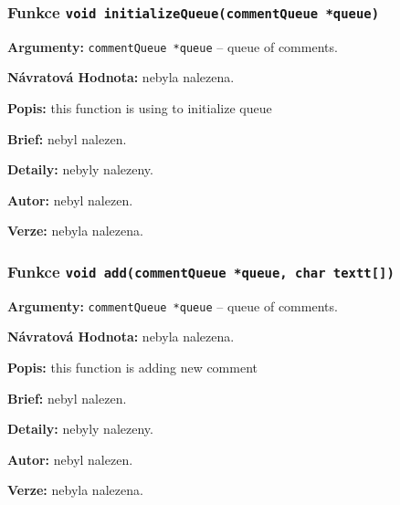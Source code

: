 \documentclass[12pt, a4paper]{article}
\begin{document}
\subsubsection{Funkce \texttt{void initializeQueue(commentQueue *queue)}}
\textbf{Argumenty: }\verb"commentQueue *queue" -- queue of comments. \\
\par\noindent
\textbf{Návratová Hodnota: }nebyla nalezena.\\
\par\noindent
\textbf{Popis: }this function is using to initialize queue\\
\par\noindent
\textbf{Brief: }nebyl nalezen.\\
\par\noindent
\textbf{Detaily: }nebyly nalezeny.\\
\par\noindent
\textbf{Autor: }nebyl nalezen.\\
\par\noindent
\textbf{Verze: }nebyla nalezena.\\
\par\noindent
\subsubsection{Funkce \texttt{void add(commentQueue *queue, char textt[])}}
\textbf{Argumenty: }\verb"commentQueue *queue" -- queue of comments. \\
\par\noindent
\textbf{Návratová Hodnota: }nebyla nalezena.\\
\par\noindent
\textbf{Popis: }this function is adding new comment\\
\par\noindent
\textbf{Brief: }nebyl nalezen.\\
\par\noindent
\textbf{Detaily: }nebyly nalezeny.\\
\par\noindent
\textbf{Autor: }nebyl nalezen.\\
\par\noindent
\textbf{Verze: }nebyla nalezena.\\
\par\noindent
\end{document}
